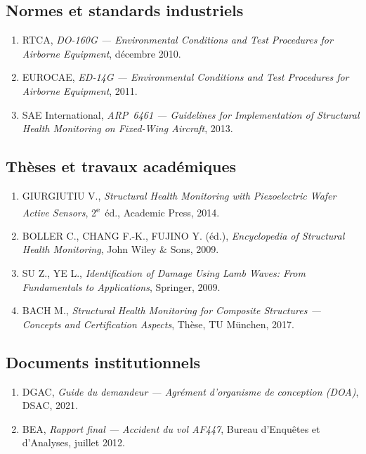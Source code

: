 \documentclass[12pt,a4paper]{article}
\begin{document}
\subsection*{Normes et standards industriels}

\begin{enumerate}
    \item RTCA, \textit{DO-160G --- Environmental Conditions and Test Procedures for Airborne Equipment}, décembre 2010.
    \item EUROCAE, \textit{ED-14G --- Environmental Conditions and Test Procedures for Airborne Equipment}, 2011.
    \item SAE International, \textit{ARP~6461 --- Guidelines for Implementation of Structural Health Monitoring on Fixed-Wing Aircraft}, 2013.
\end{enumerate}

\subsection*{Thèses et travaux académiques}

\begin{enumerate}
    \item GIURGIUTIU V., \textit{Structural Health Monitoring with Piezoelectric Wafer Active Sensors}, 2\textsuperscript{e}~éd., Academic Press, 2014.
    \item BOLLER C., CHANG F.-K., FUJINO Y. (éd.), \textit{Encyclopedia of Structural Health Monitoring}, John Wiley \& Sons, 2009.
    \item SU Z., YE L., \textit{Identification of Damage Using Lamb Waves: From Fundamentals to Applications}, Springer, 2009.
    \item BACH M., \textit{Structural Health Monitoring for Composite Structures --- Concepts and Certification Aspects}, Thèse, TU München, 2017.
\end{enumerate}

\subsection*{Documents institutionnels}

\begin{enumerate}
    \item DGAC, \textit{Guide du demandeur --- Agrément d'organisme de conception (DOA)}, DSAC, 2021.
    \item BEA, \textit{Rapport final --- Accident du vol AF447}, Bureau d'Enquêtes et d'Analyses, juillet 2012.
\end{enumerate}
\end{document}
